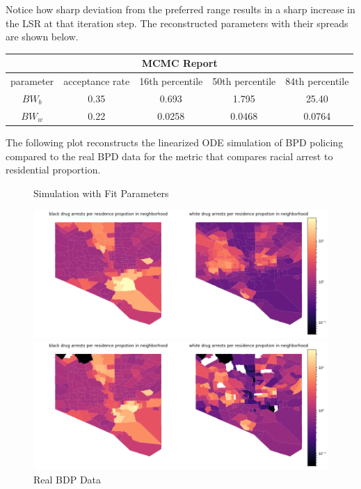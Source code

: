 \documentclass[10pt]{article}
\begin{document}
Notice how sharp deviation from the preferred range results in a sharp increase in the LSR at that iteration step. The reconstructed parameters with their spreads are shown below. 
\begin{center}
\begin{tabular}{ |c||c|c|c|c|}
 \hline
 \multicolumn{5}{|c|}{MCMC Report} \\
 \hline
  parameter & acceptance rate & 16th percentile & 50th percentile & 84th percentile \\
  \hline
 \hline
 $BW_b$ & 0.35 & 0.693 & 1.795 & 25.40\\
 \hline
 $BW_w$ & 0.22 & 0.0258 & 0.0468 & 0.0764\\
 \hline
\end{tabular}
\end{center}
The following plot reconstructs the linearized ODE simulation of BPD policing compared to the real BPD data for the metric that compares racial arrest to residential proportion.
 \begin{figure}[!htb]
 \begin{minipage}{0.5\textwidth}
     \caption{Simulation with Fit Parameters}
     \centering
     \includegraphics[width=\textwidth]{imgs/mcmcmap.png}
   \end{minipage}\hfill
   \begin{minipage}{0.5\textwidth}
     \caption{Real BDP Data}
     \centering
     \includegraphics[width=\textwidth]{imgs/logdrugpop.png}
   \end{minipage}\hfill
 \end{figure}
 
\end{document}

